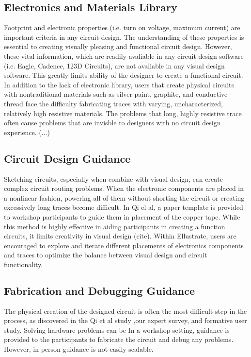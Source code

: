 \documentclass{sigchi}
\begin{document}
\subsection{Electronics and Materials Library}
Footprint and electronic properties (i.e. turn on voltage, maximum current) are important criteria in any circuit design. The understanding of these properties is essential to creating visually pleasing and functional circuit design. However, these vital information, which are readily avaliable in any circuit design software (i.e. Eagle, Cadence, 123D Circuits), are not avaliable in any visual design software. This greatly limits ability of the designer to create a functional circuit. In addition to the lack of electronic library, users that create physical circuits with nontraditional materials such as silver paint, graphite, and conductive thread face the difficulty fabricating traces with varying, uncharacterized, relatively high resistive materials. The problems that long, highly resistive trace often cause problems that are invisble to designers with no circuit design experience. (...) 

\subsection{Circuit Design Guidance}
Sketching circuits, especially when combine with visual design, can create complex circuit routing problems. When the electronic components are placed in a nonlinear fashion, powering all of them without shorting the circuit or creating excessively long traces become difficult. In Qi el al, a paper template is provided to workshop participants to guide them in placement of the copper tape. While this method is highly effective in aiding participants in creating a function circuits, it limits creativity in visual design (cite).  Within Ellustrate, users are encouraged to explore and iterate different placements of electronics components and traces to optimize the balance between visual design and circuit functionality. 
\subsection{Fabrication and Debugging Guidance}
The physical creation of the designed circuit is often the most difficult step in the process, as discovered in the Qi et al study ,our expert survey, and formative user study. Solving hardware problems can be In a workshop setting, guidance is provided to the participants to fabricate the circuit and debug any problems. However, in-person guidance is not easily scalable. 
\end{document}
